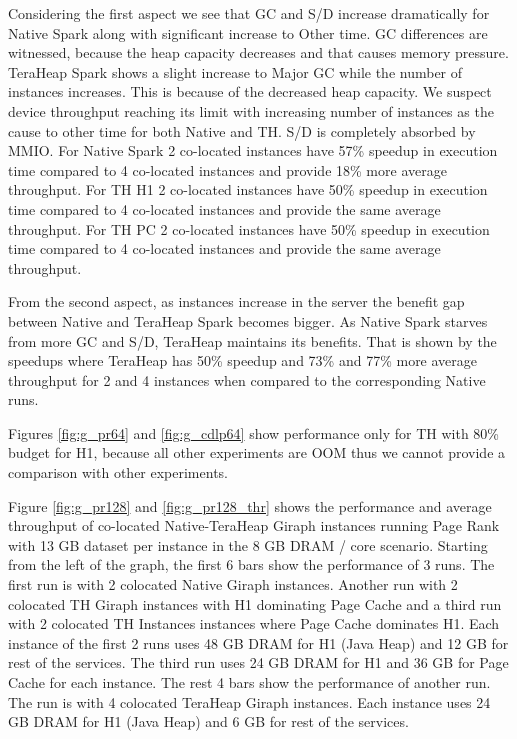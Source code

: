 Considering the first aspect we see that GC and S/D increase dramatically for Native Spark along with significant increase to Other time. GC differences are witnessed, because the heap capacity decreases and that causes memory pressure. TeraHeap Spark shows a slight increase to Major GC while the number of instances increases. This is because of the decreased heap capacity. We suspect device throughput reaching its limit with increasing number of instances as the cause to other time for both Native and TH. S/D is completely absorbed by MMIO. For Native Spark 2 co-located instances have 57\% speedup in execution time compared to 4 co-located instances and provide 18\% more average throughput. For TH H1 2 co-located instances have 50\% speedup in execution time compared to 4 co-located instances and provide the same average throughput. For TH PC 2 co-located instances have 50\% speedup in execution time compared to 4 co-located instances and provide the same average throughput. 

From the second aspect, as instances increase in the server the benefit gap between Native and TeraHeap Spark becomes bigger. As Native Spark starves from more GC and S/D, TeraHeap maintains its benefits. That is shown by the speedups where TeraHeap has 50\% speedup and 73\% and 77\% more average throughput for 2 and 4 instances when compared to the corresponding Native runs.

Figures \ref{fig:g_pr64} and \ref{fig:g_cdlp64} show performance only for TH with 80\% budget for H1, because all other experiments are
OOM thus  we cannot provide a comparison with other experiments.

Figure \ref{fig:g_pr128} and \ref{fig:g_pr128_thr} shows the performance and average throughput of co-located
Native-TeraHeap Giraph instances running Page Rank with 13 GB
dataset per instance in the 8 GB DRAM / core scenario.
Starting from the left of the graph, the first 6 bars show the
performance of 3 runs. The first run is with 2 colocated Native Giraph instances.
Another run with 2 colocated TH Giraph instances with H1 dominating Page Cache
and a third run with 2 colocated TH Instances instances where Page Cache dominates H1.
Each instance of the first 2 runs uses 48 GB DRAM for H1 (Java Heap) and 12 GB for rest of the services.
The third run uses 24 GB DRAM for H1 and 36 GB for Page Cache for each instance.
The rest 4 bars show the performance of another run. The run is with 4 colocated TeraHeap Giraph instances.
Each instance uses 24 GB DRAM for H1 (Java Heap) and 6 GB for rest of the services.



